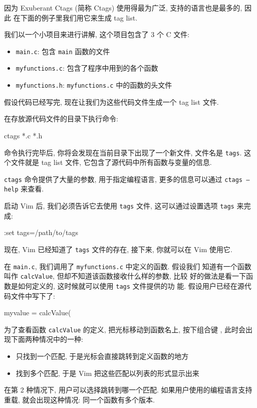 因为 Exuberant Ctags (简称 Ctags) 使用得最为广泛, 支持的语言也是最多的, 因此 
在下面的例子里我们用它来生成 tag list.

我们以一个小项目来进行讲解, 这个项目包含了 3 个 C 文件:
\begin{itemize}
    \item \texttt{main.c}: 包含 \texttt{main} 函数的文件
    \item \texttt{myfunctions.c}: 包含了程序中用到的各个函数
    \item \texttt{myfunctions.h}: \texttt{myfunctions.c} 中的函数的头文件
\end{itemize}
假设代码已经写完, 现在让我们为这些代码文件生成一个 tag list 文件.

在存放源代码文件的目录下执行命令:
\begin{vimcmd}
ctags *.c *.h
\end{vimcmd}
命令执行完毕后, 你将会发现在当前目录下出现了一个新文件, 文件名是 \texttt{tags}.
这个文件就是 tag list 文件, 它包含了源代码中所有函数与变量的信息.
\begin{warning}
    \texttt{ctags} 命令提供了大量的参数, 用于指定编程语言, 更多的信息可以通过
    \texttt{ctags --help} 来查看.
\end{warning}
启动 Vim 后, 我们必须告诉它去使用 \texttt{tags} 文件, 这可以通过设置选项
\texttt{tags} 来完成:
\begin{vimcmd}
:set tags=/path/to/tags
\end{vimcmd}
现在, Vim 已经知道了 \texttt{tags} 文件的存在, 接下来, 你就可以在 Vim  使用它.

在 \texttt{main.c}, 我们调用了 \texttt{myfunctions.c} 中定义的函数. 假设我们 
知道有一个函数叫作 \texttt{calcValue}, 但却不知道该函数接收什么样的参数, 比较 
好的做法是看一下函数是如何定义的, 这时候就可以使用 \texttt{tags} 文件提供的功
能. 假设用户已经在源代码文件中写下了:
\begin{vimcmd}
myvalue = calcValue(
\end{vimcmd}
为了查看函数 \texttt{calcValue} 的定义, 把光标移动到函数名上, 按下组合键
\key{Ctrl+]}, 此时会出现下面两种情况中的一种:
\begin{itemize}
    \item 只找到一个匹配, 于是光标会直接跳转到定义函数的地方
    \item 找到多个匹配, 于是 Vim 把这些匹配以列表的形式显示出来
\end{itemize}
在第 2 种情况下, 用户可以选择跳转到哪一个匹配. 如果用户使用的编程语言支持重载,
就会出现这种情况: 同一个函数有多个版本.

